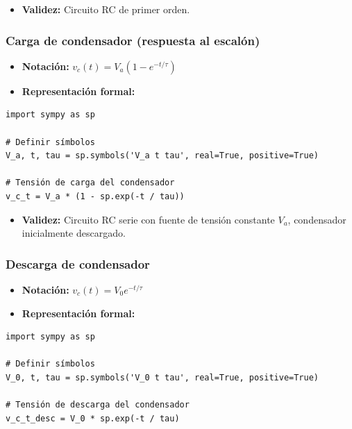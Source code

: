 \documentclass[11pt,a4paper]{article}
\begin{document}
\begin{itemize}[leftmargin=*,topsep=2pt,itemsep=1pt]
  \item \textbf{Validez:} Circuito RC de primer orden.
\end{itemize}


\subsubsection*{Carga de condensador (respuesta al escalón)}


\begin{itemize}[leftmargin=*,topsep=2pt,itemsep=1pt]
  \item \textbf{Notación:} $v_c(t) = V_a (1 - e^{-t/\tau})$
  \item \textbf{Representación formal:}
\end{itemize}


\begin{lstlisting}
import sympy as sp

# Definir símbolos
V_a, t, tau = sp.symbols('V_a t tau', real=True, positive=True)

# Tensión de carga del condensador
v_c_t = V_a * (1 - sp.exp(-t / tau))
\end{lstlisting}


\begin{itemize}[leftmargin=*,topsep=2pt,itemsep=1pt]
  \item \textbf{Validez:} Circuito RC serie con fuente de tensión constante $V_a$, condensador inicialmente descargado.
\end{itemize}


\subsubsection*{Descarga de condensador}


\begin{itemize}[leftmargin=*,topsep=2pt,itemsep=1pt]
  \item \textbf{Notación:} $v_c(t) = V_0 e^{-t/\tau}$
  \item \textbf{Representación formal:}
\end{itemize}


\begin{lstlisting}
import sympy as sp

# Definir símbolos
V_0, t, tau = sp.symbols('V_0 t tau', real=True, positive=True)

# Tensión de descarga del condensador
v_c_t_desc = V_0 * sp.exp(-t / tau)
\end{lstlisting}
\end{document}

